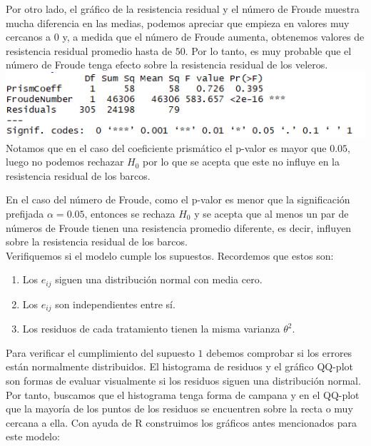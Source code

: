 \documentclass[twoside]{article}
\begin{document}
\begin{multicols}{2}
Por otro lado, el gr\'afico de la resistencia residual y el n\'umero de Froude muestra mucha diferencia en las medias, podemos apreciar que empieza en valores muy cercanos a $0$ y, a medida que el n\'umero de Froude aumenta, obtenemos valores de resistencia residual promedio hasta de $50$. Por lo tanto, es muy probable que el n\'umero de Froude tenga efecto sobre la resistencia residual de los veleros.\\

\includegraphics[scale = 0.4]{images/pic_14.png} \\

Notamos que en el caso del coeficiente prism\'atico el p-valor es mayor que $0.05$, luego no podemos rechazar $H_0$ por lo que se acepta que este no influye en la resistencia residual de los barcos.

En el caso del n\'umero de Froude, como el p-valor es menor que la significaci\'on prefijada $\alpha = 0.05$, entonces se rechaza $H_0$ y se acepta que al menos un par de n\'umeros de Froude tienen una resistencia promedio diferente, es decir, influyen sobre la resistencia residual de los barcos.\\

Verifiquemos si el modelo cumple los supuestos. Recordemos que estos son:
\begin{enumerate}
\item Los $e_{ij}$ siguen una distribuci\'on normal con media cero. 
\item Los $e_{ij}$ son independientes entre s\'i. 
\item Los residuos de cada tratamiento tienen la misma varianza $\theta^2$.\\
\end{enumerate}

Para verificar el cumplimiento del supuesto $1$ debemos comprobar si los errores est\'an normalmente distribuidos. El histograma de residuos y el gr\'afico QQ-plot son formas de evaluar visualmente si los residuos siguen una distribuci\'on normal. Por tanto, buscamos que el histograma tenga forma de campana y en el QQ-plot que la mayor\'ia de los puntos de los residuos se encuentren sobre la recta o muy cercana a ella. Con ayuda de R construimos los gr\'aficos antes mencionados para este modelo:\\


\end{multicols}
\end{document}
